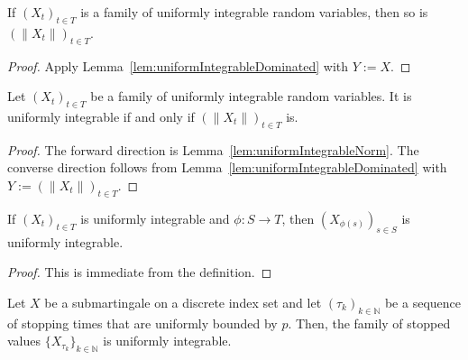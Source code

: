 \begin{lemma}\label{lem:uniformIntegrableNorm}
  \leanok
If $(X_t)_{t \in T}$ is a family of uniformly integrable random variables, then so is $(\|X_t\|)_{t \in T}$.
\end{lemma}

\begin{proof}
  \leanok
Apply Lemma~\ref{lem:uniformIntegrableDominated} with $Y := X$.
\end{proof}

\begin{lemma}\label{lem:uniformIntegrableIffNorm}
  \leanok
Let $(X_t)_{t \in T}$ be a family of uniformly integrable random variables. It is uniformly integrable if and only if $(\|X_t\|)_{t \in T}$ is.
\end{lemma}

\begin{proof}
  \leanok
The forward direction is Lemma~\ref{lem:uniformIntegrableNorm}. The converse direction follows from Lemma~\ref{lem:uniformIntegrableDominated} with $Y := (\|X_t\|)_{t \in T}$.
\end{proof}

\begin{lemma}\label{lem:uniformIntegrableComp}
  \leanok
If $(X_t)_{t \in T}$ is uniformly integrable and $\phi : S \to T$, then $(X_{\phi(s)})_{s \in S}$ is uniformly integrable.
\end{lemma}

\begin{proof}\leanok
This is immediate from the definition.
\end{proof}

\begin{lemma}\label{lem:uniformIntegrable_stoppedValue_submartingale}
  \leanok
Let $X$ be a submartingale on a discrete index set and let $(\tau_k)_{k \in \mathbb{N}}$ be a sequence of stopping times that are uniformly bounded by $p$.
Then, the family of stopped values $\{X_{\tau_k}\}_{k \in \mathbb{N}}$ is uniformly integrable.
\end{lemma}

